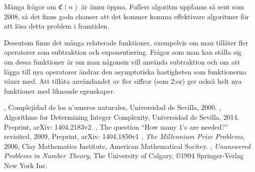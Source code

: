 \documentclass[a4paper,titlepage]{article}
\newcommand{\C}[1]{\mathfrak C \left( #1 \right)}
\theoremstyle{definition}
\begin{document}
        Många frågor om $\C{n}$ är ännu öppna. Fullers algoritm uppfanns
        så sent som 2008, så det finns goda chanser att det kommer komma
        effektivare algoritmer för att lösa detta problem i framtiden. 
        
        Dessutom finns det många relaterade funktioner, exempelvis om man tillåter
        fler operatorer som subtraktion och exponentiering. Frågor som man kan
        ställa sig om dessa funktioner är om man någonsin vill använda
        subtraktion och om att lägga till nya operatorer ändrar den
        asymptotiska hastigheten som funktionerna växer med.
        Att tillåta användandet av fler siffror (som 2:or) ger också helt nya
        funktioner med liknande egenskaper. 

\newpage
\begin{thebibliography}{9}

        , Complejidad de los n'umeros naturales,
        Universidad de Sevilla, 2000. 
     	, Algorithms for Determining
        Integer Complexity, Universidad de Sevilla, 2014. Preprint, arXiv: 1404.2183v2.
     	, The question ``How many 1’s
        are needed?'' revisited, 2009, Preprint, arXiv: 1404.1850v1
     	, \emph{The Millennium Prize Problems}, 2006, Clay Mathematics Institute, American Mathematical Socitey.
     	, \emph{Unanswered Problems in Number Theory}, The University of Calgary, 
        \copyright 1994 Springer-Verlag New York Inc. 

\end{thebibliography}
%
\end{document}
